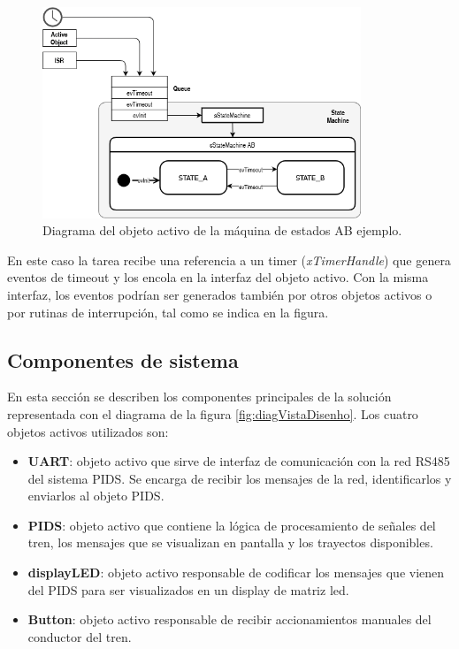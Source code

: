 \begin{figure}[ht]
	\centering
	\includegraphics[width=0.85\textwidth]{./Figures/AOstatemachineAB.png}
	\caption{Diagrama del objeto activo de la máquina de estados AB ejemplo.}
	\label{fig:AOfsmAB}
\end{figure}

En este caso la tarea recibe una referencia a un timer (\textit{xTimerHandle}) que genera eventos de timeout y los encola en la interfaz del objeto activo. Con la misma interfaz, los eventos podrían ser generados también por otros objetos activos o por rutinas de interrupción, tal como se indica en la figura.\\




\pagebreak
\subsection{Componentes de sistema}

En esta sección se describen los componentes principales de la solución representada con el diagrama de la figura \ref{fig:diagVistaDisenho}. Los cuatro objetos activos utilizados son:\\
\begin{itemize}
\item \textbf{UART}: objeto activo que sirve de interfaz de comunicación con la red RS485 del sistema PIDS. Se encarga de recibir los mensajes de la red, identificarlos y enviarlos al objeto PIDS.
\item \textbf{PIDS}: objeto activo que contiene la lógica de procesamiento de señales del tren, los mensajes que se visualizan en pantalla y los trayectos disponibles. 
\item \textbf{displayLED}: objeto activo responsable de codificar los mensajes que vienen del PIDS para ser visualizados en un display de matriz led.
\item \textbf{Button}: objeto activo responsable de recibir accionamientos manuales del conductor del tren.
\end{itemize}

